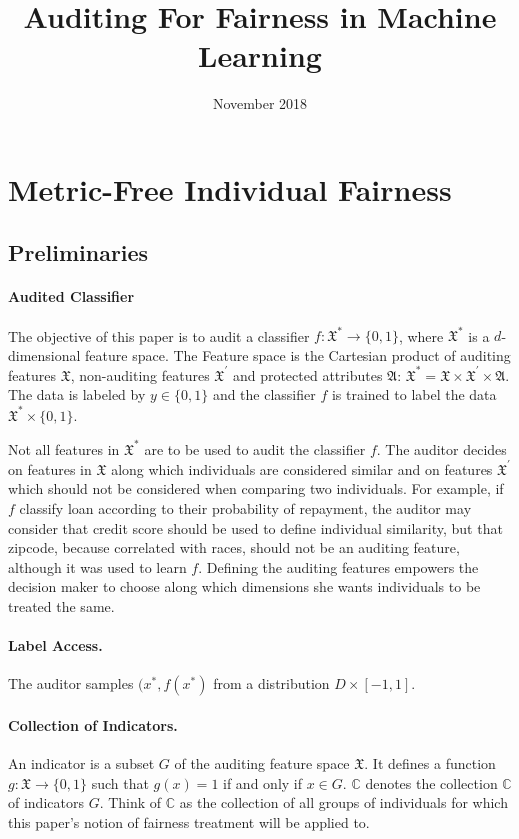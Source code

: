 \documentclass{article}
\title{Auditing For Fairness in Machine Learning}
\author{}
\date{November 2018}
\begin{document}
\maketitle

\section{Metric-Free Individual Fairness}
\subsection{Preliminaries}

\paragraph{Audited Classifier}
The objective of this paper is to audit a classifier $f:\mathfrak{X}^{*} \rightarrow \{0,1\}$, where $\mathfrak{X}^{*}$ is a $d$-dimensional feature space. The Feature space is the Cartesian product of auditing features $\mathfrak{X}$, non-auditing features $\mathfrak{X}^{'}$ and protected attributes $\mathfrak{A}$: $\mathfrak{X}^{*} = \mathfrak{X} \times \mathfrak{X}^{'} \times \mathfrak{A}$.  The data is labeled by $y\in \{0, 1\}$ and the classifier $f$ is trained to label the data $\mathfrak{X}^{*}\times \{0, 1\}$.  

\bigskip
Not all features in $\mathfrak{X}^{*}$ are to be used to audit the classifier $f$. The auditor decides on features in $\mathfrak{X}$ along which individuals are considered similar and on features $\mathfrak{X}^{'}$ which should not be considered when  comparing two individuals. For example, if $f$ classify loan according to their probability of repayment, the auditor may consider that credit score should be used to define individual similarity, but that zipcode, because correlated with races, should not be an auditing feature, although it was used to learn $f$.  Defining the auditing features empowers the decision maker to choose along which dimensions she wants individuals to be treated the same.

\paragraph{Label Access.}
The auditor samples $(x^{*}, f(x^{*})$ from a distribution $D\times [-1, 1]$. 

\paragraph{Collection of Indicators.}
An indicator is a subset $G$ of the auditing feature space $\mathfrak{X}$. It defines a function $g: \mathfrak{X} \rightarrow \{0, 1\}$ such that $g(x)=1$ if and only if $x\in G$. $\mathbb{C}$ denotes the collection $\mathbb{C}$ of indicators $G$. Think of $\mathbb{C}$ as the collection of all groups of individuals for which this paper's notion of fairness treatment will be applied to.
\end{document}
